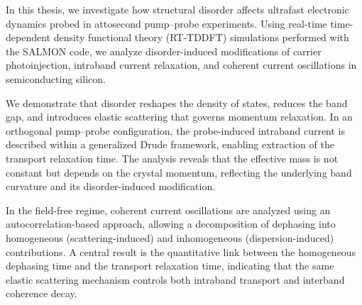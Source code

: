 
In this thesis, we investigate how structural disorder affects ultrafast electronic dynamics probed in attosecond pump–probe experiments. Using real-time time-dependent density functional theory (RT-TDDFT) simulations performed with the SALMON code, we analyze disorder-induced modifications of carrier photoinjection, intraband current relaxation, and coherent current oscillations in semiconducting silicon.

We demonstrate that disorder reshapes the density of states, reduces the band gap, and introduces elastic scattering that governs momentum relaxation. In an orthogonal pump–probe configuration, the probe-induced intraband current is described within a generalized Drude framework, enabling extraction of the transport relaxation time. The analysis reveals that the effective mass is not constant but depends on the crystal momentum, reflecting the underlying band curvature and its disorder-induced modification.

In the field-free regime, coherent current oscillations are analyzed using an autocorrelation-based approach, allowing a decomposition of dephasing into homogeneous (scattering-induced) and inhomogeneous (dispersion-induced) contributions. A central result is the quantitative link between the homogeneous dephasing time and the transport relaxation time, indicating that the same elastic scattering mechanism controls both intraband transport and interband coherence decay.
